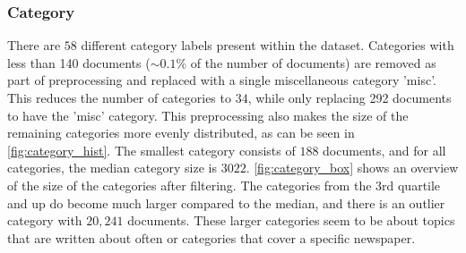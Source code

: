 \subsubsection{Category}\label{subsec:appendix_category}
There are $58$ different category labels present within the dataset.
Categories with less than 140 documents (${\sim}0.1\%$ of the number of documents) are removed as part of preprocessing and replaced with a single miscellaneous category 'misc'.
This reduces the number of categories to $34$, while only replacing 292 documents to have the 'misc' category.
This preprocessing also makes the size of the remaining categories more evenly distributed, as can be seen in \autoref{fig:category_hist}.
The smallest category consists of $188$ documents, and for all categories, the median category size is $3022$.
\autoref{fig:category_box} shows an overview of the size of the categories after filtering.
The categories from the 3rd quartile and up do become much larger compared to the median, and there is an outlier category with $20,241$ documents.
These larger categories seem to be about topics that are written about often or categories that cover a specific newspaper.

